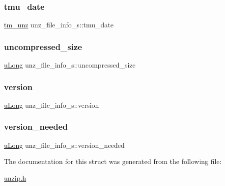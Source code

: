 \subsubsection{\texorpdfstring{tmu\+\_\+date}{tmu\_date}}
{\footnotesize\ttfamily \hyperlink{unzip_8h_a369a14c48c4b71afa6bf6cf95c6b9160}{tm\+\_\+unz} unz\+\_\+file\+\_\+info\+\_\+s\+::tmu\+\_\+date}

\mbox{\label{structunz__file__info__s_a7696a98511bc57e389485e5313a9c2bf}} 
\subsubsection{\texorpdfstring{uncompressed\+\_\+size}{uncompressed\_size}}
{\footnotesize\ttfamily \hyperlink{ioapi_8h_a50e9e9d5c30e481de822ad68fe537986}{u\+Long} unz\+\_\+file\+\_\+info\+\_\+s\+::uncompressed\+\_\+size}

\mbox{\label{structunz__file__info__s_a635f933b26b636d8314cef61af62fcef}} 
\subsubsection{\texorpdfstring{version}{version}}
{\footnotesize\ttfamily \hyperlink{ioapi_8h_a50e9e9d5c30e481de822ad68fe537986}{u\+Long} unz\+\_\+file\+\_\+info\+\_\+s\+::version}

\mbox{\label{structunz__file__info__s_a1578aca2bb7fed658f9f94c78d00288e}} 
\subsubsection{\texorpdfstring{version\+\_\+needed}{version\_needed}}
{\footnotesize\ttfamily \hyperlink{ioapi_8h_a50e9e9d5c30e481de822ad68fe537986}{u\+Long} unz\+\_\+file\+\_\+info\+\_\+s\+::version\+\_\+needed}



The documentation for this struct was generated from the following file\+:\begin{DoxyCompactItemize}
\item 
\hyperlink{unzip_8h}{unzip.\+h}\end{DoxyCompactItemize}
